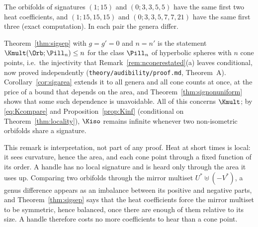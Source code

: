 \begin{example}\label{ex:siggenus}
The orbifolds of signatures $(1;15)$ and $(0;3,3,5,5)$ have the same first two heat coefficients, and
$(1;15,15,15)$ and $(0;3,3,5,7,7,21)$ have the same first three (exact computation). In each pair the genera
differ.
\end{example}

\begin{remark}\label{rem:sigK}
Theorem~\ref{thm:sigsep} with $g=g'=0$ and $n=n'$ is the statement $\Kmult(\Orb;\Pill_n)\le n$ for the class
$\Pill_n$ of hyperbolic spheres with $n$ cone points, i.e.\ the injectivity that Remark~\ref{rem:nconerestated}(a) leaves conditional, now proved
independently (\texttt{theory/audibility/proof.md}, Theorem~A). Corollary~\ref{cor:sigarea} extends it to all genera and all cone
counts at once, at the price of a bound that depends on the area, and Theorem~\ref{thm:signonuniform}
shows that some such dependence is unavoidable. All of this concerns $\Kmult$; by \eqref{eq:Kcompare}
and Proposition~\ref{prop:Kinf} (conditional on Theorem~\ref{thm:locality}), $\Kiso$ remains infinite
whenever two non-isometric orbifolds share a signature.
\end{remark}

\begin{remark}\label{rem:sigphysics}
This remark is interpretation, not part of any proof. Heat at short times is local: it sees curvature,
hence the area, and each cone point through a fixed function of its order. A handle has no local
signature and is heard only through the area it uses up. Comparing two orbifolds through the mirror
multiset $U^*\uplus(-V^*)$, a genus difference appears as an imbalance between its positive and negative
parts, and Theorem~\ref{thm:sigsep} says that the heat coefficients force the mirror multiset to be
symmetric, hence balanced, once there are enough of them relative to its size. A handle therefore costs
no more coefficients to hear than a cone point.
\end{remark}


